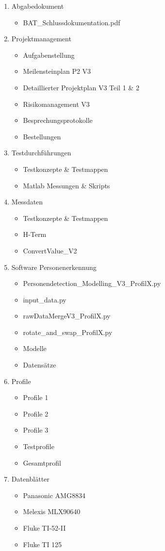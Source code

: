 			\begin{enumerate}
				\item Abgabedokument
				\begin{itemize}
					\item BAT\_Schlussdokumentation.pdf
				\end{itemize}
				\item Projektmanagement
				\begin{itemize}
					\item Aufgabenstellung
					\item Meilensteinplan P2 V3
					\item Detaillierter Projektplan V3 Teil 1 \& 2
					\item Risikomanagement V3
					\item Besprechungsprotokolle
					\item Bestellungen
				\end{itemize}
				\item Testdurchführungen
				\begin{itemize}
					\item Testkonzepte \& Testmappen
					\item Matlab Messungen \& Skripts
				\end{itemize}
				\item Messdaten
				\begin{itemize}
					\item Testkonzepte \& Testmappen
					\item H-Term 
					\item ConvertValue\_V2
				\end{itemize}
				\item Software Personenerkennung
				\begin{itemize}
					\item Personendetection\_Modelling\_V3\_ProfilX.py
					\item input\_data.py
					\item rawDataMergeV3\_ProfilX.py
					\item rotate\_and\_swap\_ProfilX.py
					\item Modelle
					\item Datensätze
				\end{itemize}
				\item Profile
				\begin{itemize}
					\item Profile 1
					\item Profile 2
					\item Profile 3
					\item Testprofile 	
					\item Gesamtprofil	
				\end{itemize}
				\item Datenblätter
				\begin{itemize}
					\item Panasonic AMG8834
					\item Melexis MLX90640
					\item Fluke TI-52-II
					\item Fluke TI 125 
				\end{itemize}
			\end{enumerate}
			
			\newpage
			

				
